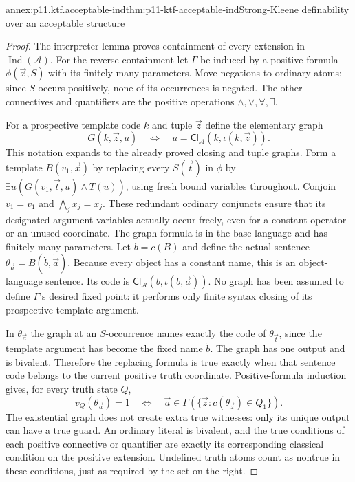 \begin{annexitem}{annex:p11.ktf.acceptable-ind}{thm:p11-ktf-acceptable-ind}{Strong-Kleene definability over an acceptable structure}
\begin{proof}
The interpreter lemma proves containment of every extension in
\(\operatorname{Ind}(\mathcal A)\). For the reverse containment
let \(\Gamma\) be induced by a positive formula
\(\phi(\vec x,S)\) with its finitely many parameters. Move
negations to ordinary atoms; since \(S\) occurs positively,
none of its occurrences is negated. The other connectives and
quantifiers are the positive operations \(\land,\lor,\forall,\exists\).

For a prospective template code \(k\) and tuple \(\vec z\)
define the elementary graph
\[
 G(k,\vec z,u)\quad\Longleftrightarrow\quad
 u=\mathsf{Cl}_{\mathcal A}(k,\iota(k,\vec z)).
\]
This notation expands to the already proved closing and tuple graphs.
Form a template \(B(v_1,\vec x)\) by replacing every
\(S(\vec t)\) in \(\phi\) by
\(\exists u(G(v_1,\vec t,u)\land T(u))\), using fresh bound
variables throughout. Conjoin \(v_1=v_1\) and
\(\bigwedge_j x_j=x_j\). These redundant ordinary conjuncts
ensure that its designated argument variables actually occur freely,
even for a constant operator or an unused coordinate. The graph
formula is in the base language and has finitely many parameters.
Let \(b=c(B)\) and define the actual sentence
\(\theta_{\vec a}=B(\dot b,\dot{\vec a})\).
Because every object has a constant name, this is an object-language
sentence. Its code is \(\mathsf{Cl}_{\mathcal A}
(b,\iota(b,\vec a))\). No graph has been assumed to define
\(\Gamma\)'s desired fixed point: it performs only finite syntax
closing of its prospective template argument.

In \(\theta_{\vec a}\) the graph at an \(S\)-occurrence
names exactly the code of \(\theta_{\vec t}\), since the
template argument has become the fixed name \(\dot b\).
The graph has one output and is bivalent. Therefore the replacing
formula is true exactly when that sentence code belongs to the
current positive truth coordinate. Positive-formula induction gives,
for every truth state \(Q\),
\[
 v_Q(\theta_{\vec a})=1
 \quad\Longleftrightarrow\quad
 \vec a\in\Gamma(\{\vec z:c(\theta_{\vec z})\in Q_1\}).
\]
The existential graph does not create extra true witnesses: only
its unique output can have a true guard. An ordinary literal is
bivalent, and the true conditions of each positive connective or
quantifier are exactly its corresponding classical condition on the
positive extension. Undefined truth atoms count as nontrue in these
conditions, just as required by the set on the right.


\end{proof}
\end{annexitem}
